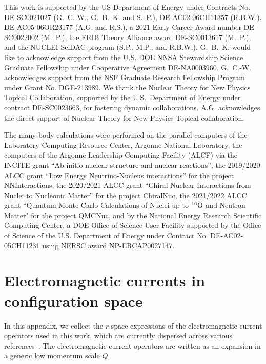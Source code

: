 \documentclass[aps,prc,floatfix,showpacs,twocolumn, preprintnumbers]{revtex4-2}
\begin{document}
 This work is supported by the US Department of Energy under Contracts No. DE-SC0021027 (G.~C.-W., G.~B.~K. and S.~P.), DE-AC02-06CH11357 (R.B.W.), DE-AC05-06OR23177 (A.G. and R.S.), a 2021 Early Career Award number DE-SC0022002 (M.~P.), the FRIB Theory Alliance award DE-SC0013617 (M.~P.), and the NUCLEI SciDAC program (S.P., M.P., and R.B.W.). G.~B.~K. would like to acknowledge support from the U.S. DOE NNSA Stewardship Science Graduate Fellowship under Cooperative Agreement DE-NA0003960. G.~C.-W. acknowledges support from the NSF Graduate Research Fellowship Program under Grant No. DGE-213989. We thank the Nuclear Theory for New Physics Topical Collaboration, supported by the U.S.~Department of Energy under contract DE-SC0023663, for fostering dynamic collaborations.
 A.G. acknowledges the direct support of Nuclear Theory for New Physics Topical collaboration.

The many-body calculations were performed on the parallel computers of the Laboratory Computing Resource Center, Argonne National Laboratory, the computers of the Argonne Leadership Computing Facility (ALCF) via the INCITE grant ``Ab-initio nuclear structure and nuclear reactions'', the 2019/2020 ALCC grant ``Low Energy Neutrino-Nucleus interactions'' for the project NNInteractions, the 2020/2021 ALCC grant ``Chiral Nuclear Interactions from Nuclei to Nucleonic Matter'' for the project ChiralNuc, the 2021/2022 ALCC grant ``Quantum Monte Carlo Calculations of Nuclei up to $^{16}{\rm O}$ and Neutron Matter" for the project \mbox{QMCNuc}, and by the National Energy Research
Scientific Computing Center, a DOE Office of Science User Facility
supported by the Office of Science of the U.S. Department of Energy
under Contract No. DE-AC02-05CH11231 using NERSC award
NP-ERCAP0027147.


\appendix

\section{Electromagnetic currents in configuration space }
\label{app:currr}


In this appendix, we collect the $r$-space expressions of the electromagnetic current operators used in this work, which are currently dispersed across various references~\cite{Pastore:2008ui,Pastore:2009is,Pastore:2011ip,Piarulli:2012bn,Schiavilla:2018udt,Gnech:2022vwr}. The electromagnetic current operators are written as an expansion in a generic low momentum scale $Q$. 
\end{document}
